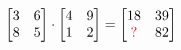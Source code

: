 \documentclass[border=5pt]{standalone}
\begin{document}
      $\begin{bmatrix} 3 & 6 \\ 8 & 5 \end{bmatrix} \cdot \begin{bmatrix} 4 & 9 \\ 1 & 2 \end{bmatrix} = \begin{bmatrix} 18 & 39 \\ \textcolor{red}{?} & 82 \end{bmatrix}$
      
\end{document}
